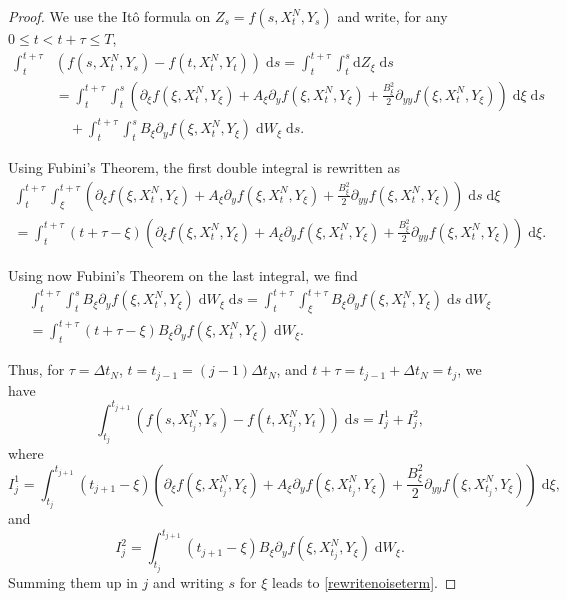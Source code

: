 \documentclass[reqno,12pt]{amsart}
\theoremstyle{plain}%
\theoremstyle{definition}
\begin{document}
\begin{proof}
    We use the It\^o formula on $Z_s = f(s, X_t^N, Y_s)$ and write, for any $0 \leq t < t + \tau \leq T$,
    \begin{align*}
        \int_t^{t + \tau} & \left(f(s, X_t^N, Y_s) - f(t, X_t^N, Y_t) \right)\;\mathrm{d}s  = \int_t^{t + \tau} \int_t^s \mathrm{d}Z_\xi \;\mathrm{d}s \\
        & = \int_t^{t + \tau} \int_t^s \left(\partial_\xi f(\xi, X_t^N, Y_\xi) + A_\xi \partial_y f(\xi, X_t^N, Y_\xi)  + \frac{B_\xi^2}{2}\partial_{yy}f(\xi, X_t^N, Y_\xi) \right) \;\mathrm{d}\xi\;\mathrm{d}s \\ 
        & \quad + \int_t^{t + \tau} \int_t^s B_\xi \partial_y f(\xi, X_t^N, Y_\xi)\;\mathrm{d}W_\xi\;\mathrm{d}s.
    \end{align*}

    Using Fubini's Theorem, the first double integral is rewritten as
    \begin{multline*}
        \int_t^{t + \tau} \int_\xi^{t+\tau} \left(\partial_\xi f(\xi, X_t^N, Y_\xi) + A_\xi \partial_y f(\xi, X_t^N, Y_\xi)  + \frac{B_\xi^2}{2}\partial_{yy}f(\xi, X_t^N, Y_\xi) \right) \;\mathrm{d}s\;\mathrm{d}\xi \\
        = \int_t^{t + \tau} (t+\tau - \xi) \left(\partial_\xi f(\xi, X_t^N, Y_\xi) + A_\xi \partial_y f(\xi, X_t^N, Y_\xi)  + \frac{B_\xi^2}{2}\partial_{yy}f(\xi, X_t^N, Y_\xi) \right) \;\mathrm{d}\xi.
    \end{multline*}

    Using now Fubini's Theorem on the last integral, we find
    \begin{multline*}
        \int_t^{t + \tau} \int_t^s B_\xi \partial_y f(\xi, X_t^N, Y_\xi)\;\mathrm{d}W_\xi\;\mathrm{d}s 
        = \int_t^{t + \tau} \int_\xi^{t + \tau} B_\xi \partial_y f(\xi, X_t^N, Y_\xi) \;\mathrm{d}s \;\mathrm{d}W_\xi \\
        = \int_t^{t+\tau} (t + \tau - \xi) B_\xi \partial_y f(\xi, X_t^N, Y_\xi) \;\mathrm{d}W_\xi.
    \end{multline*}

    Thus, for $\tau = \Delta t_N$, $t = t_{j-1} = (j-1)\Delta t_N$, and $t + \tau = t_{j-1} + \Delta t_N = t_j$, we have
    \[
        \int_{t_j}^{t_{j+1}} \left(f(s, X_{t_j}^N, Y_s) - f(t, X_{t_j}^N, Y_t) \right)\;\mathrm{d}s = I_j^{1} + I_j^{2},
    \]
    where
    \[
        I_j^1 = \int_{t_j}^{t_{j+1}} (t_{j+1} - \xi) \left(\partial_\xi f(\xi, X_{t_j}^N, Y_\xi) + A_\xi \partial_y f(\xi, X_{t_j}^N, Y_\xi)  + \frac{B_\xi^2}{2}\partial_{yy}f(\xi, X_{t_j}^N, Y_\xi) \right) \;\mathrm{d}\xi,
    \]
    and
    $$
        I_j^2 = \int_{t_j}^{t_{j+1}}  (t_{j+1} - \xi) B_\xi \partial_y f(\xi, X_{t_j}^N, Y_\xi) \;\mathrm{d}W_\xi.
    $$
    Summing them up in $j$ and writing $s$ for $\xi$ leads to \eqref{rewritenoiseterm}.
\end{proof}
\end{document}
